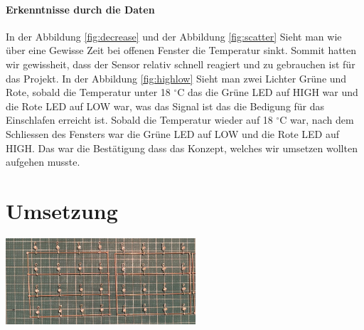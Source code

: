 \documentclass{article}
\begin{document}
\paragraph{Erkenntnisse durch die Daten}
In der Abbildung \ref{fig:decrease} und der Abbildung \ref{fig:scatter} Sieht man wie über eine Gewisse Zeit bei offenen Fenster die Temperatur sinkt. Sommit hatten wir gewissheit, dass der Sensor relativ schnell reagiert und zu gebrauchen ist für das Projekt.
In der Abbildung \ref{fig:highlow} Sieht man zwei Lichter Grüne und Rote, sobald die Temperatur unter 18 $^\circ$C das die Grüne LED auf HIGH war und die Rote LED  auf LOW war, was das Signal ist das die Bedigung für das Einschlafen erreicht ist. Sobald die Temperatur wieder auf 18 $^\circ$C war, nach dem Schliessen des Fensters war die Grüne LED auf LOW und die Rote LED auf HIGH.
Das war die Bestätigung dass das Konzept, welches wir umsetzen wollten aufgehen musste. 
\section{Umsetzung}
\begin{center}
\includegraphics[width=0.53\textwidth]{bilder/layers.jpeg}
\end{center}
\end{document}
